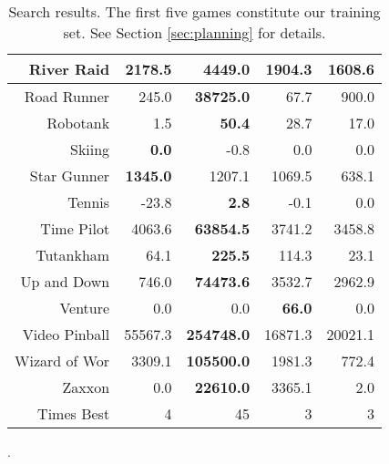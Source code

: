 \documentclass[twoside,11pt]{article}
\newcommand{\gamename}[1]{{\sc #1}}
\begin{document}
\begin{table}[h!]
\begin{center}
\begin{tabular}{|r|r|r|r|r|}
\hline
\gamename{River Raid} & 2178.5& \textbf { 4449.0 }& 1904.3& 1608.6\\
\hline
\gamename{Road Runner} & 245.0& \textbf { 38725.0 }& 67.7& 900.0\\
\hline
\gamename{Robotank} & 1.5& \textbf { 50.4 }& 28.7& 17.0\\
\hline
\gamename{Skiing} & \textbf { 0.0 }& -0.8& 0.0& 0.0\\
\hline
\gamename{Star Gunner} & \textbf { 1345.0 }& 1207.1& 1069.5& 638.1\\
\hline
\gamename{Tennis} & -23.8& \textbf { 2.8 }& -0.1& 0.0\\
\hline
\gamename{Time Pilot} & 4063.6& \textbf { 63854.5 }& 3741.2& 3458.8\\
\hline
\gamename{Tutankham} & 64.1& \textbf { 225.5 }& 114.3& 23.1\\
\hline
\gamename{Up and Down} & 746.0& \textbf { 74473.6 }& 3532.7& 2962.9\\
\hline
\gamename{Venture} & 0.0& 0.0& \textbf { 66.0 }& 0.0\\
\hline
\gamename{Video Pinball} & 55567.3& \textbf { 254748.0 }& 16871.3& 20021.1\\
\hline
\gamename{Wizard of Wor} & 3309.1& \textbf { 105500.0 }& 1981.3& 772.4\\
\hline
\gamename{Zaxxon} & 0.0& \textbf { 22610.0 }& 3365.1& 2.0\\
\hline
\hline
Times Best & 4& 45& 3& 3\\
\hline
\end{tabular}
\clearpage{}
\caption{Search results. The first five games constitute our training set. See Section \ref{sec:planning} for details.\label{table:appendix:detailed_results:search}}.
\end{center}
\end{table}

\newpage

\nocite{Russell97rationalityand,Hutter:04uaibook,legg08machine}


\end{document}
